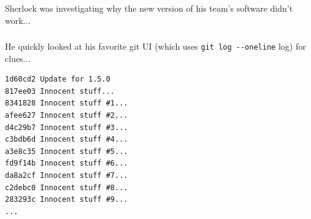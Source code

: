 {
\begin{frame}[plain]
  \frametitle{\insertsubsubsection}

  \vspace*{.6\textheight}
  \begin{center}\color{White}
    \Large{Sherlock was investigating why the new version of his team's software didn't work...}
  \end{center}

\end{frame}
}


\begin{frame}[fragile]
  \frametitle{\insertsubsubsection}

    He quickly looked at his favorite git UI (which uses \texttt{git log -{}-oneline} log) for clues...\\\vspacing

  \begin{small}
\begin{verbatim}
1d60cd2 Update for 1.5.0
817ee03 Innocent stuff...
8341828 Innocent stuff #1...
afee627 Innocent stuff #2...
d4c29b7 Innocent stuff #3...
c3bdb6d Innocent stuff #4...
a3e8c35 Innocent stuff #5...
fd9f14b Innocent stuff #6...
da8a2cf Innocent stuff #7...
c2debc0 Innocent stuff #8...
283293c Innocent stuff #9...
...
\end{verbatim}
  \end{small}

\end{frame}

